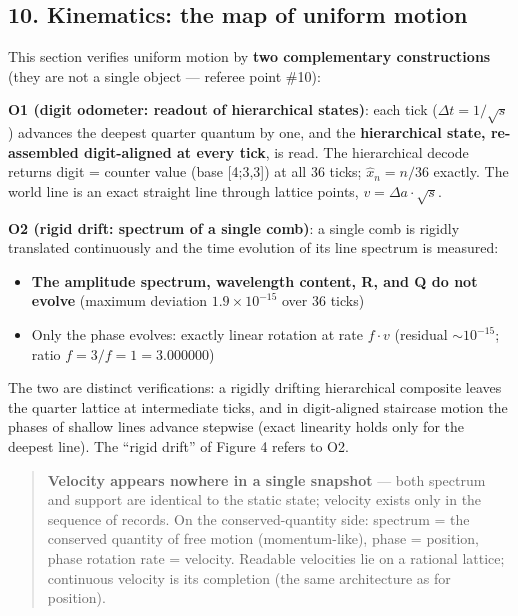\documentclass[
]{ltjsarticle}
\providecommand{\tightlist}{%
  \setlength{\itemsep}{0pt}\setlength{\parskip}{0pt}}
\begin{document}
\subsection{10. Kinematics: the map of uniform
motion}\label{kinematics-the-map-of-uniform-motion}

This section verifies uniform motion by \textbf{two complementary
constructions} (they are not a single object --- referee point \#10):

\textbf{O1 (digit odometer: readout of hierarchical states)}: each tick
(\(\Delta t=1/\sqrt s\)) advances the deepest quarter quantum by one,
and the \textbf{hierarchical state, re-assembled digit-aligned at every
tick}, is read. The hierarchical decode returns digit = counter value
(base {[}4;3,3{]}) at all 36 ticks; \(\hat x_n=n/36\) exactly. The world
line is an exact straight line through lattice points,
\(v=\Delta a\cdot\sqrt s\).

\textbf{O2 (rigid drift: spectrum of a single comb)}: a single comb is
rigidly translated continuously and the time evolution of its line
spectrum is measured:

\begin{itemize}
\tightlist
\item
  \textbf{The amplitude spectrum, wavelength content, R, and Q do not
  evolve} (maximum deviation \(1.9\times10^{-15}\) over 36 ticks)
\item
  Only the phase evolves: exactly linear rotation at rate \(f\cdot v\)
  (residual \(\sim10^{-15}\); ratio \(f{=}3/f{=}1=3.000000\))
\end{itemize}

The two are distinct verifications: a rigidly drifting hierarchical
composite leaves the quarter lattice at intermediate ticks, and in
digit-aligned staircase motion the phases of shallow lines advance
stepwise (exact linearity holds only for the deepest line). The ``rigid
drift'' of Figure 4 refers to O2.

\begin{quote}
\textbf{Velocity appears nowhere in a single snapshot} --- both
\textbar spectrum\textbar{} and support are identical to the static
state; velocity exists only in the sequence of records. On the
conserved-quantity side: \textbar spectrum\textbar{} = the conserved
quantity of free motion (momentum-like), phase = position, phase
rotation rate = velocity. Readable velocities lie on a rational lattice;
continuous velocity is its completion (the same architecture as for
position).
\end{quote}
\end{document}
